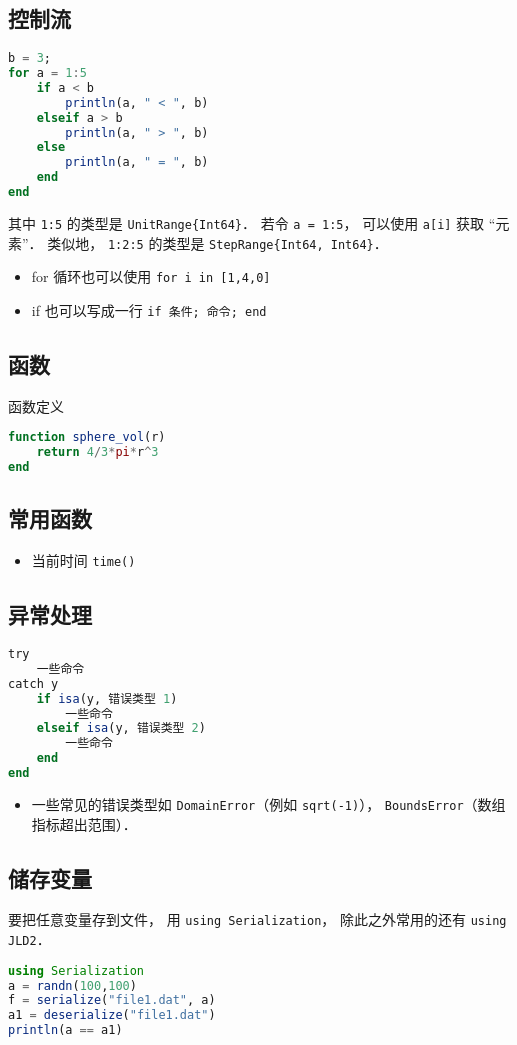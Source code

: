 \subsection{控制流}
\begin{lstlisting}[language=Julia]
b = 3;
for a = 1:5
    if a < b
        println(a, " < ", b)
    elseif a > b
        println(a, " > ", b)
    else
        println(a, " = ", b)
    end
end
\end{lstlisting}
其中 \verb|1:5| 的类型是 \verb|UnitRange{Int64}|． 若令 \verb|a = 1:5|， 可以使用 \verb|a[i]| 获取 “元素”． 类似地， \verb|1:2:5| 的类型是 \verb|StepRange{Int64, Int64}|．

\begin{itemize}
\item for 循环也可以使用 \verb|for i in [1,4,0]|
\item if 也可以写成一行 \verb|if 条件; 命令; end|
\end{itemize}

\subsection{函数}
函数定义
\begin{lstlisting}[language=julia]
function sphere_vol(r)
    return 4/3*pi*r^3
end
\end{lstlisting}

\subsection{常用函数}
\begin{itemize}
\item 当前时间 \verb|time()|
\end{itemize}

\subsection{异常处理}
\begin{lstlisting}[language=julia]
try
    一些命令
catch y
    if isa(y, 错误类型 1)
        一些命令
    elseif isa(y, 错误类型 2)
        一些命令
    end
end
\end{lstlisting}
\begin{itemize}
\item 一些常见的错误类型如 \verb|DomainError|（例如 \verb|sqrt(-1)|）， \verb|BoundsError|（数组指标超出范围）．
\end{itemize}


\subsection{储存变量}
要把任意变量存到文件， 用 \verb|using Serialization|， 除此之外常用的还有 \verb|using JLD2|．
\begin{lstlisting}[language=julia]
using Serialization
a = randn(100,100)
f = serialize("file1.dat", a)
a1 = deserialize("file1.dat")
println(a == a1)
\end{lstlisting}


